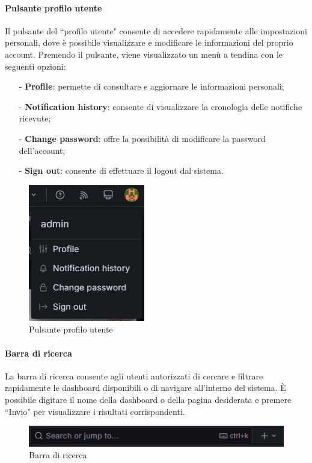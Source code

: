 \documentclass[10pt]{article}
\begin{document}
\begin{justify}
    \paragraph{Pulsante profilo utente}
    Il pulsante del ``profilo utente" consente di accedere rapidamente alle impostazioni personali, dove è possibile visualizzare e modificare le informazioni del proprio account. Premendo il pulsante, viene visualizzato un menù a tendina con le seguenti opzioni:
    \begin{itemize}
        \item[-] \textbf{Profile}: permette di consultare e aggiornare le informazioni personali;
        \item[-] \textbf{Notification history}: consente di visualizzare la cronologia delle notifiche ricevute;
        \item[-] \textbf{Change password}: offre la possibilità di modificare la password dell'account;
        \item[-] \textbf{Sign out}: consente di effettuare il logout dal sistema.
    \end{itemize}
    \begin{figure}[H]
    \centering
    \includegraphics[width=0.25\linewidth]{profilo.png}
    \caption{Pulsante profilo utente}
    \end{figure}

    \paragraph{Barra di ricerca}
    La barra di ricerca consente agli utenti autorizzati di cercare e filtrare rapidamente le dashboard disponibili o di navigare all'interno del sistema. È possibile digitare il nome della dashboard o della pagina desiderata e premere ``Invio" per visualizzare i risultati corrispondenti.
    \begin{figure}[H]
    \centering
    \includegraphics[width=0.6\linewidth]{ricerca.png}
    \caption{Barra di ricerca}
    \end{figure}


\end{justify}
\end{document}
